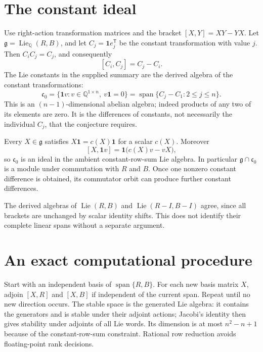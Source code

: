 \section{The constant ideal}
\label{notation:lie-constants}

Use right-action transformation matrices and the bracket $[X,Y]=XY-YX$.
Let $\mathfrak g=\operatorname{Lie}_{\mathbb Q}(R,B)$, and let
$C_j=\mathbf{1} e_j^{\mathsf{T}}$ be the constant transformation with value $j$.
Then $C_iC_j=C_j$, and consequently
\[
 [C_i,C_j]=C_j-C_i.
\]
The Lie constants in the supplied summary are the derived algebra of the
constant transformations:
\[
 \mathfrak c_0=
 \{\mathbf{1} v:v\in\mathbb Q^{1\times n},\ v\mathbf{1}=0\}
 =\operatorname{span}\{C_j-C_1:2\le j\le n\}.
\]
This is an $(n-1)$-dimensional abelian algebra; indeed products of any two
of its elements are zero. It is the differences of constants, not
necessarily the individual $C_j$, that the conjecture requires.

Every $X\in\mathfrak g$ satisfies $X\mathbf{1}=c(X)\mathbf{1}$ for a scalar $c(X)$.
Moreover
\[
 [X,\mathbf{1} v]=\mathbf{1}\bigl(c(X)v-vX\bigr),
\]
so $\mathfrak c_0$ is an ideal in the ambient constant-row-sum Lie algebra.
In particular $\mathfrak g\cap\mathfrak c_0$ is a module under commutation
with $R$ and $B$. Once one nonzero constant difference is obtained, its
commutator orbit can produce further constant differences.

The derived algebras of $\operatorname{Lie}(R,B)$ and $\operatorname{Lie}(R-I,B-I)$ agree, since
all brackets are unchanged by scalar identity shifts. This does not
identify their complete linear spans without a separate argument.

\section{An exact computational procedure}
Start with an independent basis of $\operatorname{span}\{R,B\}$. For each new basis
matrix $X$, adjoin $[X,R]$ and $[X,B]$ if independent of the current span.
Repeat until no new direction occurs. The stable space is the generated
Lie algebra: it contains the generators and is stable under their adjoint
actions; Jacobi's identity then gives stability under adjoints of all Lie
words. Its dimension is at most $n^2-n+1$ because of the constant-row-sum
constraint. Rational row reduction avoids floating-point rank decisions.

